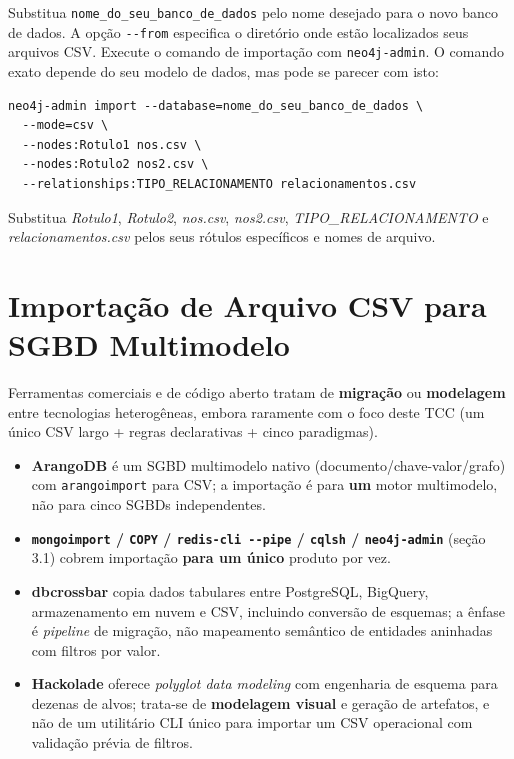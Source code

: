 Substitua \texttt{nome\_do\_seu\_banco\_de\_dados} pelo nome desejado para o novo banco de
dados. A opção \texttt{-{}-from} especifica o diretório onde estão localizados seus
arquivos CSV. Execute o comando de importação com \texttt{neo4j-admin}. O comando exato
depende do seu modelo de dados, mas pode se parecer com isto:

\begin{lstlisting}[style=bashstyle]
neo4j-admin import --database=nome_do_seu_banco_de_dados \
  --mode=csv \
  --nodes:Rotulo1 nos.csv \
  --nodes:Rotulo2 nos2.csv \
  --relationships:TIPO_RELACIONAMENTO relacionamentos.csv
\end{lstlisting}

Substitua \textit{Rotulo1}, \textit{Rotulo2}, \textit{nos.csv}, \textit{nos2.csv},
\textit{TIPO\_RELACIONAMENTO} e \textit{relacionamentos.csv} pelos seus rótulos específicos
e nomes de arquivo.

\section{Importação de Arquivo CSV para SGBD Multimodelo}

Ferramentas comerciais e de código aberto tratam de \textbf{migração} ou
\textbf{modelagem} entre tecnologias heterogêneas, embora raramente com o foco deste TCC
(um único CSV largo + regras declarativas + cinco paradigmas).

\begin{itemize}
  \item \textbf{ArangoDB} é um SGBD multimodelo nativo (documento/chave-valor/grafo) com
        \texttt{arangoimport} para CSV; a importação é para \textbf{um} motor multimodelo,
        não para cinco SGBDs independentes.

  \item \textbf{\texttt{mongoimport} / \texttt{COPY} / \texttt{redis-cli -\/-pipe} /
        \texttt{cqlsh} / \texttt{neo4j-admin}} (seção 3.1) cobrem importação \textbf{para
        um único} produto por vez.

  \item \textbf{dbcrossbar} \cite{dbcrossbar2024} copia dados tabulares entre PostgreSQL,
        BigQuery, armazenamento em nuvem e CSV, incluindo conversão de esquemas; a ênfase é
        \textit{pipeline} de migração, não mapeamento semântico de entidades aninhadas com
        filtros por valor.

  \item \textbf{Hackolade} \cite{hackolade2024polyglot} oferece \textit{polyglot data
        modeling} com engenharia de esquema para dezenas de alvos; trata-se de
        \textbf{modelagem visual} e geração de artefatos, e não de um utilitário CLI único
        para importar um CSV operacional com validação prévia de filtros.
\end{itemize}

